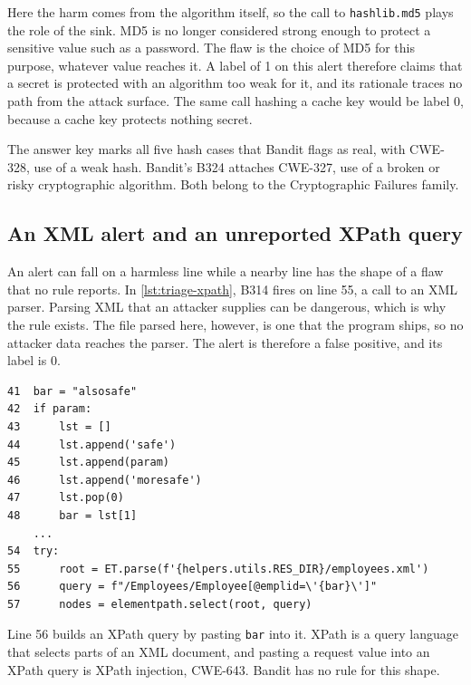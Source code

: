 Here the harm comes from the algorithm itself, so the call to \texttt{hashlib.md5} plays the role of
the sink. MD5 is no longer considered strong enough to protect a sensitive value such as a password.
The flaw is the choice of MD5 for this purpose, whatever value reaches it. A label of 1 on this alert
therefore claims that a secret is protected with an algorithm too weak for it, and its rationale
traces no path from the attack surface. The same call hashing a cache key would be label 0, because
a cache key protects nothing secret.

The answer key marks all five hash cases that Bandit flags as real, with CWE-328, use of a weak
hash. Bandit's B324 attaches CWE-327, use of a broken or risky cryptographic algorithm. Both belong
to the Cryptographic Failures family.

\subsection{An XML alert and an unreported XPath query}
\label{sec:triage-xpath}

An alert can fall on a harmless line while a nearby line has the shape of a flaw that no rule
reports. In \cref{lst:triage-xpath}, B314 fires on line 55, a call to an XML parser. Parsing XML that
an attacker supplies can be dangerous, which is why the rule exists. The file parsed here, however,
is one that the program ships, so no attacker data reaches the parser. The alert is therefore a false
positive, and its label is 0.

\noindent\begin{minipage}{\linewidth}
\begin{lstlisting}[breakatwhitespace=true, basicstyle=\ttfamily\footnotesize, caption={An XML alert on a fixed file and an XPath query: BenchmarkTest00013, lines 41 to 57.}, label=lst:triage-xpath]
41  bar = "alsosafe"
42  if param:
43      lst = []
44      lst.append('safe')
45      lst.append(param)
46      lst.append('moresafe')
47      lst.pop(0)
48      bar = lst[1]
    ...
54  try:
55      root = ET.parse(f'{helpers.utils.RES_DIR}/employees.xml')
56      query = f"/Employees/Employee[@emplid=\'{bar}\']"
57      nodes = elementpath.select(root, query)
\end{lstlisting}
\end{minipage}

Line 56 builds an XPath query by pasting \texttt{bar} into it. XPath is a query language that
selects parts of an XML document, and pasting a request value into an XPath query is XPath
injection, CWE-643. Bandit has no rule for this shape.

